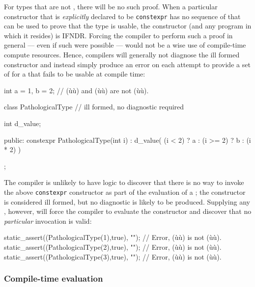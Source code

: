 \begin{enumerate}
{\noindent For types that are not , there will
be no such proof. When a particular constructor that is
\emph{explicitly} declared to be \lstinline!constexpr! has no sequence of
 that can be used to prove that the type is
usable, the constructor (and any program in which it resides) is IFNDR.
Forcing the compiler to perform such a proof in general --- even if such
were possible --- would not be a wise use of compile-time compute
resources. Hence, compilers will generally not diagnose the ill formed
constructor and instead simply produce an error on each attempt to
provide a set of  for a  that
fails to be usable at compile time:

\begin{emcppslisting}
int a = 1, b = 2;  // (ù{}ù) and (ù{}ù) are not (ù{}ù).

class PathologicalType  // ill formed, no diagnostic required
{
    int d_value;

public:
    constexpr PathologicalType(int i)
        : d_value( (i <  2) ? a
                 : (i >= 2) ? b
                 : (i * 2) ) { }
};
\end{emcppslisting}


\noindent The compiler is unlikely to have logic to discover that there is no way
to invoke the above \lstinline!constexpr! constructor as part of the
evaluation of a ; the constructor is
considered ill formed, but no diagnostic is likely to be produced.
Supplying any , however, will force the
compiler to evaluate the constructor and discover that no
\emph{particular} invocation is valid:

\begin{emcppslisting}
static_assert((PathologicalType(1),true), "");  // Error, (ù{}ù) is not (ù{}ù).
static_assert((PathologicalType(2),true), "");  // Error, (ù{}ù) is not (ù{}ù).
static_assert((PathologicalType(3),true), "");  // Error, (ù{}ù) is not (ù{}ù).
\end{emcppslisting}
}
\end{enumerate}


\subsubsection[Compile-time evaluation]{Compile-time evaluation}\label{compile-time-evaluation}

